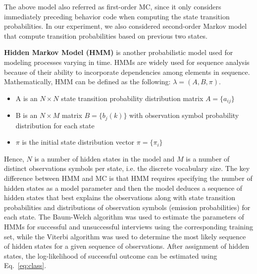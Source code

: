 \documentclass{amia_summit_2018}
\begin{document}
The above model also referred as first-order MC, since it only considers immediately preceding behavior code when computing the state transition probabilities. In our experiment, we also considered second-order Markov model that compute transition probabilities based on previous two states.  

\textbf {Hidden Markov Model (HMM)} is another probabilistic model used for modeling processes varying in time. HMMs are widely used for sequence analysis because of their ability to incorporate dependencies among elements in sequence. Mathematically, HMM can be defined as the following: $\lambda = (A, B, \pi)$.
\begin{itemize}
\item A is an $N\times N$ state transition probability distribution matrix $A = \{a_{ij}\}$
\item B is an $N\times M$ matrix $B = \{b_j(k)\}$ with observation symbol probability distribution for each state 
\item $\pi$ is the initial state distribution vector $\pi = \{\pi_i\}$
\end{itemize}
Hence, $N$ is a number of hidden states in the model and $M$ is a number of distinct observations symbols per state, i.e. the discrete vocabulary size. The key difference between HMM and MC is that HMM requires specifying the number of hidden states as a model parameter and then the model deduces a sequence of hidden states that best explains the observations along with state transition probabilities and distributions of observation symbols (emission probabilities) for each state. The Baum-Welch algorithm was used to estimate the parameters of HMMs for successful and unsuccessful interviews using the corresponding training set, while the Viterbi algorithm was used to determine the most likely sequence of hidden states for a given sequence of observations. After assignment of hidden states, the log-likelihood of successful outcome can be estimated using Eq.~\ref{eq:class}.
\end{document}
